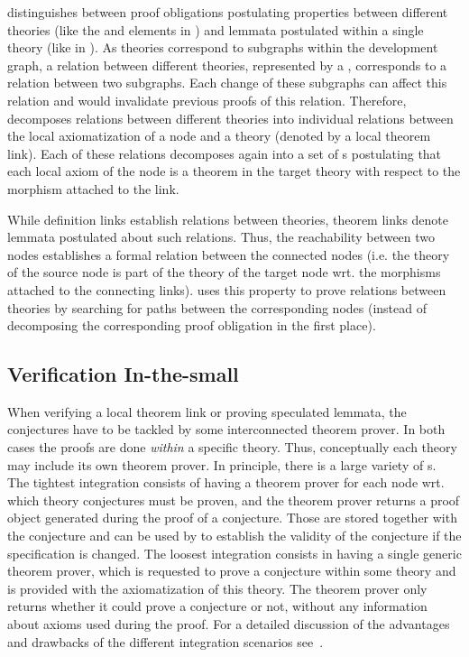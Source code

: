 {\maya} distinguishes between proof obligations postulating properties between different
theories (like the {} and {} elements
in {\omdoc}) and lemmata postulated within a single theory (like {} in
{\omdoc}).  As theories correspond to subgraphs within the development graph, a relation
between different theories, represented by a {},
corresponds to a relation between two subgraphs.  Each change of these subgraphs can
affect this relation and would invalidate previous proofs of this relation. Therefore,
{\maya} decomposes relations between different theories into individual relations between
the local axiomatization of a node and a theory (denoted by a local theorem link). Each of
these relations decomposes again into a set of {s} postulating
that each local axiom of the node is a theorem in the target theory with respect to the
morphism attached to the link.

While definition links establish relations between theories, theorem links denote
lemmata postulated about such relations. Thus, the reachability between two nodes
establishes a formal relation between the connected nodes (i.e. the theory of the
source node is part of the theory of the target node wrt. the morphisms attached
to the connecting links). {\maya} uses this property to prove relations between
theories by searching for paths between the corresponding nodes (instead of
decomposing the corresponding proof obligation in the first place).

\subsection{Verification In-the-small}

When verifying a local theorem link or proving speculated lemmata, the conjectures have to
be tackled by some interconnected theorem prover.  In both cases the proofs are done
{\emph{within}} a specific theory.  Thus, conceptually each theory may include its own
theorem prover.  In principle, there is a large variety of
{s}. The tightest integration consists of having a theorem
prover for each node wrt.  which theory conjectures must be proven, and the theorem prover
returns a proof object generated during the proof of a conjecture.  Those are stored
together with the conjecture and can be used by {\maya} to establish the validity of the
conjecture if the specification is changed. The loosest integration consists in having a
single generic theorem prover, which is requested to prove a conjecture within some theory
and is provided with the axiomatization of this theory. The theorem prover only returns
whether it could prove a conjecture or not, without any information about axioms used
during the proof. For a detailed discussion of the advantages and drawbacks of the
different integration scenarios see~\cite{AutMos:ihdgmm02}.

